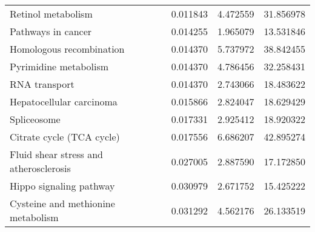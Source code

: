 \begin{tabular}{lrrr}
                          Retinol metabolism &          0.011843 & 4.472559 &       31.856978 \\
                          Pathways in cancer &          0.014255 & 1.965079 &       13.531846 \\
                    Homologous recombination &          0.014370 & 5.737972 &       38.842455 \\
                       Pyrimidine metabolism &          0.014370 & 4.786456 &       32.258431 \\
                               RNA transport &          0.014370 & 2.743066 &       18.483622 \\
                    Hepatocellular carcinoma &          0.015866 & 2.824047 &       18.629429 \\
                                 Spliceosome &          0.017331 & 2.925412 &       18.920322 \\
                   Citrate cycle (TCA cycle) &          0.017556 & 6.686207 &       42.895274 \\
      Fluid shear stress and atherosclerosis &          0.027005 & 2.887590 &       17.172850 \\
                     Hippo signaling pathway &          0.030979 & 2.671752 &       15.425222 \\
          Cysteine and methionine metabolism &          0.031292 & 4.562176 &       26.133519 \\
\bottomrule
\end{tabular}
